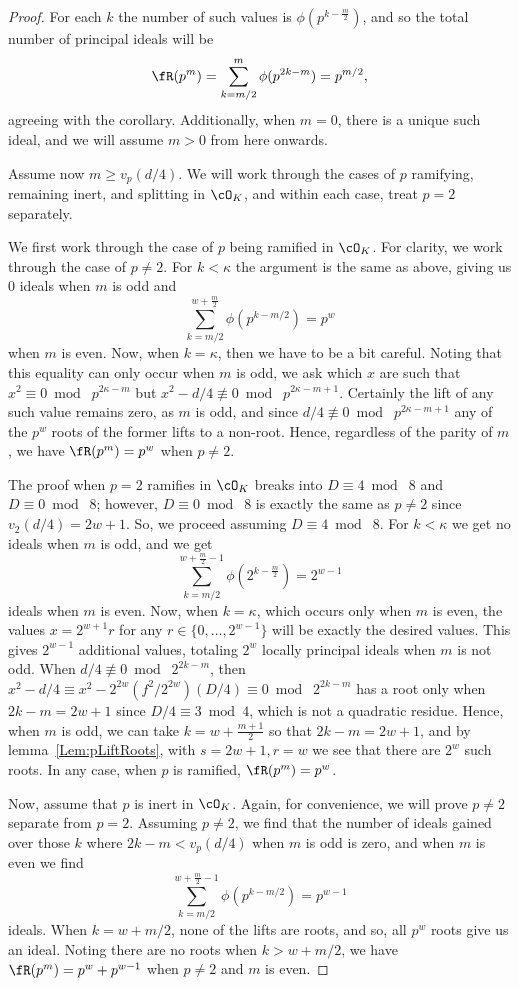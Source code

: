 \documentclass[11pt, proquest]{uwthesis}
\begin{document}
\begin{proof}
For each $k$ the number of such values is $\phi(p^{k-\frac{m}{2}})$, and so the total number of principal ideals will be
\[
\fR(p^m) = \sum_{k=m/2}^{m} \phi(p^{2k-m}) = p^{m/2},
\]
agreeing with the corollary.
Additionally, when $m=0$, there is a unique such ideal, and we will assume $m>0$ from here onwards.

Assume now $m\geq v_p(d/4)$. We will work through the cases of $p$ ramifying, remaining inert, and splitting in $\cO_K$, and within each case, treat $p=2$ separately.

We first work through the case of $p$ being ramified in $\cO_K$.
For clarity, we work through the case of $p\ne 2$.
For $k < \kappa$ the argument is the same as above, giving us $0$ ideals when $m$ is odd and
\[
\sum_{k=m/2}^{w+\frac{m}{2}}\phi(p^{k-m/2}) = p^w
\]
when $m$ is even.
Now, when $k = \kappa$, then we have to be a bit careful.
Noting that this equality can only occur when $m$ is odd, we ask which $x$ are such that $x^2\equiv 0\bmod\; p^{2\kappa-m}$ but $x^2-d/4\not\equiv 0\bmod\; p^{2\kappa-m+1}$.
Certainly the lift of any such value remains zero, as $m$ is odd, and since $d/4\not\equiv 0\bmod\; p^{2\kappa-m+1}$ any of the $p^{w}$ roots of the former lifts to a non-root.
Hence, regardless of the parity of $m$, we have $\fR(p^m) = p^w$ when $p\ne 2$.

The proof when $p=2$ ramifies in $\cO_K$ breaks into $D\equiv 4\bmod\; 8$ and $D\equiv 0\bmod\; 8$; however, $D\equiv 0\bmod\; 8$ is exactly the same as $p\ne 2$ since $v_2(d/4) = 2w+1$.
So, we proceed assuming $D\equiv 4\bmod\; 8$.
For $k < \kappa$ we get no ideals when $m$ is odd, and we get
\[
\sum_{k=m/2}^{w+\frac{m}{2}-1} \phi(2^{k-\frac{m}{2}}) = 2^{w-1}
\]
ideals when $m$ is even.
Now, when $k=\kappa$, which occurs only when $m$ is even, the values $x=2^{w+1}r$ for any $r\in\{0,\ldots,2^{w-1}\}$ will be exactly the desired values.
This gives $2^{w-1}$ additional values, totaling $2^w$ locally principal ideals when $m$ is not odd.
When $d/4\not\equiv 0\bmod\; 2^{2k-m}$, then $x^2-d/4\equiv x^2 - 2^{2w}(f^2/2^{2w})(D/4)\equiv 0\bmod\; 2^{2k-m}$ has a root only when $2k-m = 2w+1$ since $D/4\equiv 3\bmod 4$, which is not a quadratic residue.
Hence, when $m$ is odd, we can take $k = w+\frac{m+1}{2}$ so that $2k-m=2w+1$, and by lemma~\ref{Lem:pLiftRoots}, with $s=2w+1,r=w$ we see that there are $2^w$ such roots.
In any case, when $p$ is ramified, $\fR(p^m) = p^w$.

Now, assume that $p$ is inert in $\cO_K$.
Again, for convenience, we will prove $p\ne2$ separate from $p= 2$.
Assuming $p\ne 2$, we find that the number of ideals gained over those $k$ where $2k-m<v_p(d/4)$ when $m$ is odd is zero, and when $m$ is even we find
\[
\sum_{k=m/2}^{w+\frac{m}{2}-1} \phi(p^{k-m/2}) = p^{w-1}
\]
ideals.
When $k=w+m/2$, none of the lifts are roots, and so, all $p^w$ roots give us an ideal.
Noting there are no roots when $k>w+m/2$, we have $\fR(p^m) = p^w+p^{w-1}$ when $p\ne 2$ and $m$ is even.


\end{proof}
\end{document}
